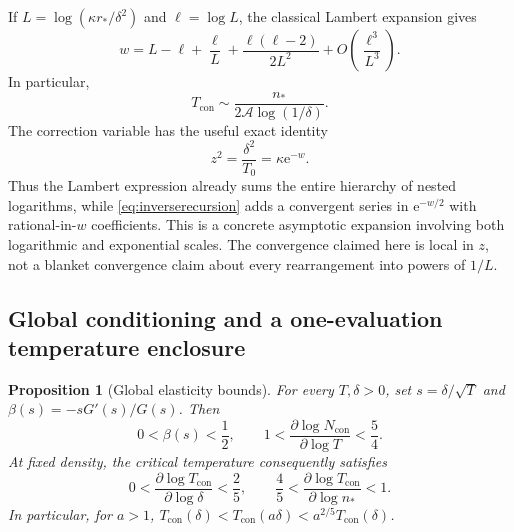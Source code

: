 \documentclass[11pt,a4paper]{article}
\numberwithin{equation}{section}
\newtheorem{proposition}[theorem]{Proposition}
\theoremstyle{definition}
\newcommand{\con}{\mathrm{con}}
\newcommand{\e}{\mathrm e}
\newcommand{\Aconst}{\mathcal A}
\begin{document}
If $L=\log(\kappa r_*/\delta^2)$ and $\ell=\log L$, the classical
Lambert expansion \cite{Corless1996} gives
\begin{equation}
 w=L-\ell+\frac\ell L+\frac{\ell(\ell-2)}{2L^2}
       +O\left(\frac{\ell^3}{L^3}\right).
 \label{eq:Wexpansion}
\end{equation}
In particular,
\begin{equation}
 T_{\con}\sim\frac{n_*}{2\Aconst\log(1/\delta)}.
 \label{eq:Tleading}
\end{equation}
The correction variable has the useful exact identity
\begin{equation}
 z^2=\frac{\delta^2}{T_0}=\kappa\e^{-w}.
 \label{eq:zexp}
\end{equation}
Thus the Lambert expression already sums the entire hierarchy of
nested logarithms, while \eqref{eq:inverserecursion} adds a convergent
series in $\e^{-w/2}$ with rational-in-$w$ coefficients. This is a
concrete asymptotic expansion involving both logarithmic and exponential
scales. The convergence claimed here is local in $z$, not a blanket
convergence claim about every rearrangement into powers of $1/L$.

\subsection{Global conditioning and a one-evaluation temperature enclosure}

\begin{proposition}[Global elasticity bounds]
\label{prop:conditioning}
For every $T,\delta>0$, set $s=\delta/\sqrt T$ and
$\beta(s)=-sG'(s)/G(s)$. Then
\begin{equation}
 0<\beta(s)<\frac12,\qquad
 1<\frac{\partial\log N_{\con}}{\partial\log T}<\frac54.
 \label{eq:elasticities}
\end{equation}
At fixed density, the critical temperature consequently satisfies
\begin{equation}
 0<\frac{\partial\log T_{\con}}{\partial\log\delta}<\frac25,
 \qquad
 \frac45<\frac{\partial\log T_{\con}}{\partial\log n_*}<1.
 \label{eq:inverseelasticities}
\end{equation}
In particular, for $a>1$,
$T_{\con}(\delta)<T_{\con}(a\delta)<a^{2/5}T_{\con}(\delta)$.
\end{proposition}
\end{document}
